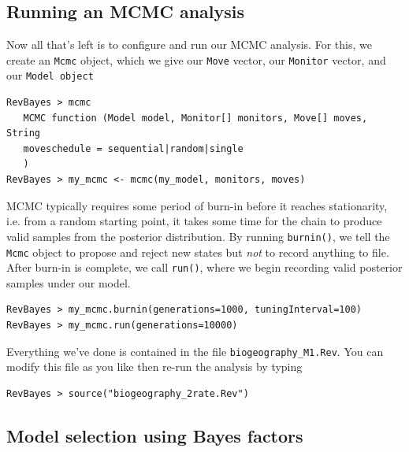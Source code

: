 \documentclass[11pt]{article}
\begin{document}
\subsection{Running an MCMC analysis}

Now all that's left is to configure and run our MCMC analysis.
For this, we create an {\tt Mcmc} object, which we give our {\tt Move} vector, our {\tt Monitor} vector, and our {\tt Model object}

\begin{snugshade}
\begin{lstlisting}
RevBayes > mcmc
   MCMC function (Model model, Monitor[] monitors, Move[] moves, String
   moveschedule = sequential|random|single
   )
RevBayes > my_mcmc <- mcmc(my_model, monitors, moves)
\end{lstlisting}
\end{snugshade}

MCMC typically requires some period of burn-in before it reaches stationarity, i.e. from a random starting point, it takes some time for the chain to produce valid samples from the posterior distribution.
By running {\tt burnin()}, we tell the {\tt Mcmc} object to propose and reject new states but {\it not} to record anything to file.
After burn-in is complete, we call {\tt run()}, where we begin recording valid posterior samples under our model.

\begin{snugshade}
\begin{lstlisting}
RevBayes > my_mcmc.burnin(generations=1000, tuningInterval=100)
RevBayes > my_mcmc.run(generations=10000)
\end{lstlisting}
\end{snugshade}

Everything we've done is contained in the file {\tt biogeography\_M1.Rev}.
You can modify this file as you like then re-run the analysis by typing

\begin{snugshade}
\begin{lstlisting}
RevBayes > source("biogeography_2rate.Rev")
\end{lstlisting}
\end{snugshade}

\subsection{Model selection using Bayes factors}
\end{document}
